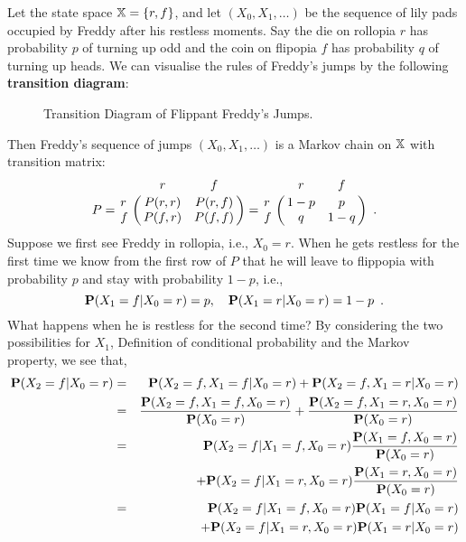 {\begin{example}
Let the state space $\mathbb{X}=\{r,f\}$, and let $(X_0, X_1,\ldots)$ be the sequence of lily pads occupied by Freddy after his restless moments.  Say the die on rollopia $r$ has probability $p$ of turning up odd and the coin on flipopia $f$ has probability $q$ of turning up heads.  We can visualise the rules of Freddy's jumps by the following {\bf transition diagram}:
\begin{figure}[htpb]
\caption{Transition Diagram of Flippant Freddy's Jumps.\label{F:FlippantFreddyTransDiag}}
\centering   {}
\end{figure}

Then Freddy's sequence of jumps $(X_0, X_1,\ldots)$ is a Markov chain on $\mathbb{X}$ with transition matrix:
\begin{equation}\label{E:FlippantFreddyP}
P 
= \bordermatrix{~ & r & f \cr 
r & P(r,r) & P(r,f)\cr 
f & P(f,r) & P(f,f) }
= \bordermatrix{~ & r & f \cr 
r & 1-p & p \cr
f & q & 1-q } \enspace .
\end{equation}
Suppose we first see Freddy in rollopia, i.e., $X_0=r$.  When he gets restless for the first time we know from the first row of $P$ that he will leave to flippopia with probability $p$ and stay with probability $1-p$, i.e.,
\begin{equation}\label{E:Freddy1Step}
\mathbf{P}(X_1=f | X_0=r) = p, \quad \mathbf{P}(X_1=r | X_0=r) = 1-p \enspace .
\end{equation}
What happens when he is restless for the second time?  By considering the two possibilities for $X_1$, Definition of conditional probability and the Markov property, we see that,
\begin{eqnarray}
\p(X_2 = f | X_0 = r) 
&=& \p(X_2=f, X_1=f | X_0=r) + \p(X_2=f, X_1=r | X_0=r) \notag \\
&=& \frac{\p(X_2=f, X_1=f , X_0=r)}{\p(X_0=r)} + \frac{\p(X_2=f, X_1=r , X_0=r)}{\p(X_0=r)} \notag \\
&=& \p(X_2=f | X_1=f , X_0=r)\frac{\p(X_1=f , X_0=r)}{\p(X_0=r)} \notag \\
&& \qquad + \p(X_2=f | X_1=r , X_0=r) \frac{\p(X_1=r , X_0=r)}{\p(X_0=r)} \notag \\
&=&{\p(X_2=f | X_1=f , X_0=r)\p(X_1=f | X_0=r)} \notag \\
&& \qquad +{\p(X_2=f | X_1=r , X_0=r) \p(X_1=r | X_0=r)} \notag \\

\end{eqnarray}
\end{example}}
